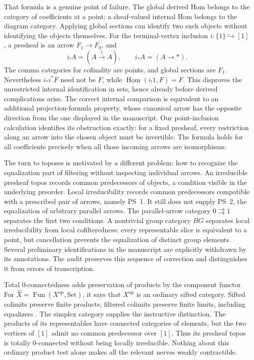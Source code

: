 That formula is a genuine point of failure. The global derived Hom belongs to the category of coefficients at a point; a sheaf-valued internal Hom belongs to the diagram category. Applying global sections can identify two such objects without identifying the objects themselves. For the terminal-vertex inclusion $i:\{1\}\hookrightarrow[1]$, a presheaf is an arrow $F_1\to F_0$, and
\[
 i_!A=(A\xrightarrow{1}A),\qquad i_*A=(A\to *).
\]
The comma categories for cofinality are points, and global sections are $F_1$. Nevertheless $i_*i^*F$ need not be $F$, while $\underline{\operatorname{Hom}}(i_!1,F)=F$. This disproves the unrestricted internal identification in sets, hence already before derived complications arise. The correct internal comparison is equivalent to an additional projection-formula property, whose canonical arrow has the opposite direction from the one displayed in the manuscript. Our point-inclusion calculation identifies its obstruction exactly: for a fixed presheaf, every restriction along an arrow into the chosen object must be invertible. The formula holds for all coefficients precisely when all those incoming arrows are isomorphisms.

The turn to toposes is motivated by a different problem: how to recognize the equalization part of filtering without inspecting individual arrows. An irreducible presheaf topos records common predecessors of objects, a condition visible in the underlying preorder. Local irreducibility records common predecessors compatible with a prescribed pair of arrows, namely PS~1. It still does not supply PS~2, the equalization of arbitrary parallel arrows. The parallel-arrow category $0\rightrightarrows1$ separates the first two conditions. A nontrivial group category $BG$ separates local irreducibility from local cofilteredness: every representable slice is equivalent to a point, but cancellation prevents the equalization of distinct group elements. Several preliminary identifications in the manuscript are explicitly withdrawn by its annotations. The audit preserves this sequence of correction and distinguishes it from errors of transcription.

Total $0$-connectedness adds preservation of products by the component functor. For $\widehat X=\operatorname{Fun}(X^{\mathrm{op}},\mathrm{Set})$, it says that $X^{\mathrm{op}}$ is an ordinary sifted category. Sifted colimits preserve finite products; filtered colimits preserve finite limits, including equalizers \citep{AdamekRosickyVitale2010}. The simplex category supplies the instructive distinction. The products of its representables have connected categories of elements, but the two vertices of $[1]$ admit no common predecessor over $[1]$. Thus its presheaf topos is totally $0$-connected without being locally irreducible. Nothing about this ordinary product test alone makes all the relevant nerves weakly contractible.

